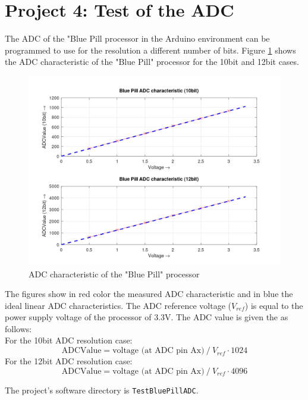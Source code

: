 \documentclass[11pt, oneside]{scrartcl}   	%
\begin{document}
\section{Project 4: Test of the ADC}
The ADC of the "Blue Pill processor in the Arduino environment can be programmed to use for the resolution a different number of bits. 
Figure \ref{fig:BluePillADC} shows the ADC characteristic of the "Blue Pill" processor for the 10bit and 12bit cases.
\begin{figure}[htbp]
	\centering
	\includegraphics[width=0.9\linewidth]{Figures/BluePillADCCharacteristic.png}
	\caption{ADC characteristic of the "Blue Pill" processor}
	\label{fig:BluePillADC}
\end{figure}
The figures show in red color the measured ADC characteristic and in blue the ideal linear ADC characteristics.
The ADC reference voltage ($V_{ref}$) is equal to the power supply voltage of the processor of 3.3V.
The ADC value is given the as follows:\\
For the 10bit ADC resolution case:
\begin{equation*}
 \text{ADCValue} = \text{voltage (at ADC pin Ax)} ~/~ V_{ref} \cdot 1024
\end{equation*}
For the 12bit ADC resolution case:
\begin{equation*}
\text{ADCValue} = \text{voltage (at ADC pin Ax)} ~/~ V_{ref} \cdot 4096
\end{equation*}

The project's software directory is \verb!TestBluePillADC!.


\newpage
\end{document}

